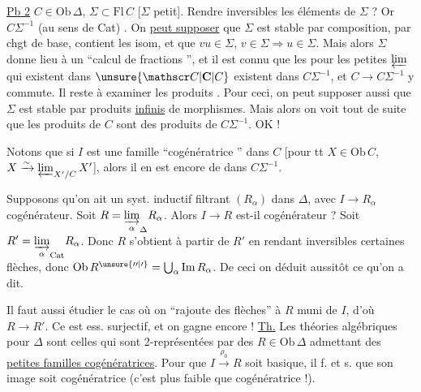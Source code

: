 \uline{Pb 2} $C\in\mathrm{Ob}\,\Delta$, $\Sigma\subset\mathrm{Fl}\,C$ [$\Sigma$ petit]. Rendre inversibles les éléments de $\Sigma$ ?  Or $C\Sigma^{-1}$ (au sens de Cat) . On \uline{peut supposer} que $\Sigma$ est stable par composition, par chgt de base, contient les isom, et  que $vu\in\Sigma$, $v\in\Sigma\Longrightarrow u\in\Sigma$. Mais alors $\Sigma$ donne lieu à un ``calcul de fractions '', et il est connu que  les  pour les petites $\varprojlim$ qui existent dans $\unsure{\mathscr C|\mathbf C|C}$ existent dans $C\Sigma^{-1}$, et $C\longrightarrow C\Sigma^{-1}$ y commute.
Il reste à examiner les produits . Pour ceci, on peut supposer aussi que $\Sigma$ est stable par produits \uline{infinis} de morphismes. Mais alors on voit tout de suite que les produits de $C$ sont des produits de $C\Sigma^{-1}$. OK !

Notons que si $I$ est une famille ``cogénératrice '' dans  $C$ [pour tt $X\in\mathrm{Ob}\,C$, $X\xrightarrow{\sim}\varprojlim_{X^{\prime}/C}X'$], alors il en est encore de  dans $C\Sigma^{-1}$. 

Supposons qu'on ait un  syst. inductif filtrant $(R_\alpha)$ dans $\Delta$, avec $I\longrightarrow R_\alpha$ cogénérateur. Soit $R=\underset{\alpha}{\varinjlim}_{\Delta}R_\alpha$. Alors $I\longrightarrow R$ est-il cogénérateur ? Soit $R'=\underset{\alpha}{\varinjlim}_{\mathrm{Cat}}R_\alpha$.  Donc $R$ s'obtient à partir de $R'$ en rendant inversibles certaines flèches, donc $\mathrm{Ob}\,R^{\unsure{\prime\prime|\prime}}=\bigcup_{\alpha}\mathrm{Im}\,R_\alpha$. De ceci on déduit aussitôt ce qu'on a dit.

Il faut aussi étudier le cas où on ``rajoute des flèches'' à $R$ muni de $I$, d'où $R\longrightarrow R'$. Ce   est ess. surjectif, et on gagne encore !
\uline{Th.} Les théories algébriques pour $\Delta$ sont celles qui sont 2-représentées par des $R\in\mathrm{Ob}\,\Delta$ admettant des \uline{petites familles  cogénératrices}. Pour que $I\xrightarrow{\rho_0}R$  soit \inserted{$\Delta$-}basique, il f. et s. que son image soit cogénératrice (c'est plus faible que  cogénératrice !).

